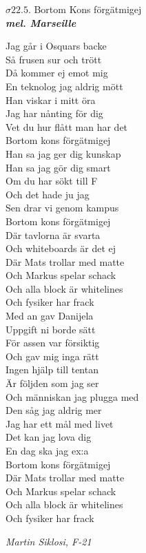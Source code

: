 \documentclass[a6paper,10pt]{article}
\newcommand{\mel}[1]{\small\textbf{\textit{mel. #1 \\}}}
\begin{document}
\begin{center}
\Large $\sigma22.5$. Bortom Kons förgätmigej\\
\mel{Marseille}
\end{center}
Jag går i Osquars backe\\
Så frusen sur och trött\\
Då kommer ej emot mig\\
En teknolog jag aldrig mött
\vspace{5pt}\\
Han viskar i mitt öra\\
Jag har nånting för dig\\
Vet du hur flått man har det\\
Bortom kons förgätmigej
\vspace{5pt}\\
Han sa jag ger dig kunskap\\
Han sa jag gör dig smart\\
Om du har sökt till F\\
Och det hade ju jag
\vspace{5pt}\\
Sen drar vi genom kampus\\
Bortom kons förgätmigej\\
Där tavlorna är svarta\\
Och whiteboards är det ej
\vspace{5pt}\\
Där Mats trollar med matte\\
Och Markus spelar schack\\
Och alla block är whitelines\\
Och fysiker har frack
\vspace{5pt}\\
Med an gav Danijela\\
Uppgift ni borde sätt\\
För assen var försiktig\\
Och gav mig inga rätt
\vspace{5pt}\\
\newpage
\noindent
Ingen hjälp till tentan\\
Är följden som jag ser\\
Och människan jag plugga med\\
Den såg jag aldrig mer
\vspace{5pt}\\
Jag har ett mål med livet\\
Det kan jag lova dig\\
En dag ska jag ex:a\\
Bortom kons förgätmigej
\vspace{5pt}\\
Där Mats trollar med matte\\
Och Markus spelar schack\\
Och alla block är whitelines\\
Och fysiker har frack\\

\begin{flushright}
\textit{Martin Siklosi, F-21}
\end{flushright}
\end{document}
